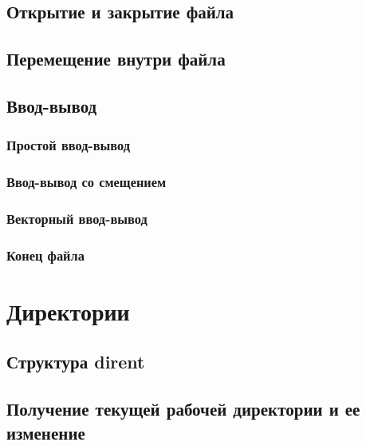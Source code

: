 \documentclass[oneside]{book}
\begin{document}
		\section{Открытие и закрытие файла}
		
		
		\section{Перемещение внутри файла}
		
		
		\section{Ввод-вывод}
		
	
			\subsection{Простой ввод-вывод}
			
			
			\subsection{Ввод-вывод со смещением}
			
			
			\subsection{Векторный ввод-вывод}
			
			
		\subsection{Конец файла}
		
		
	\chapter{Директории}
		
	
		\section{Структура dirent}
		
		
		\section{Получение текущей рабочей директории и ее изменение}
			
		
\end{document}
